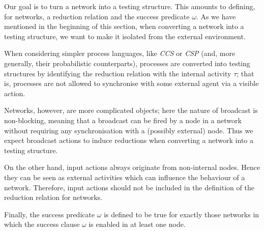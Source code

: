 \documentclass{LMCS}
\begin{document}
Our goal is to turn a network into a testing structure. This amounts to defining, 
for networks, a reduction relation and the success predicate $\omega$.
As we have mentioned in the beginning of this section, when converting a 
network into a testing structure, we want to  make it 
isolated from the external environment. 

When considering simpler process languages, like \emph{CCS} or \emph{CSP} 
(and, more generally, their probabilistic counterparts), 
processes are converted into testing structures by identifying the reduction 
relation with the internal activity $\tau$; that is, processes are 
not allowed to synchronise with some external agent via a visible action. 

Networks, however, are more complicated objects; here the nature of 
broadcast is non-blocking, meaning that a broadcast can be 
fired by a node in a network without requiring any synchronisation 
with a (possibly external) node. Thus we expect broadcast 
actions to induce reductions when converting a network into a testing structure.

On the other hand, input actions always originate from non-internal 
nodes. Hence they can be seen as external activities which can influence 
 the behaviour of a 
network. Therefore, input actions should not be included in the definition 
of the reduction relation for networks. 

Finally, the success predicate $\omega$ is defined to be true for exactly 
those networks in which the success clause $\omega$ is enabled in 
at least one node.
\end{document}
